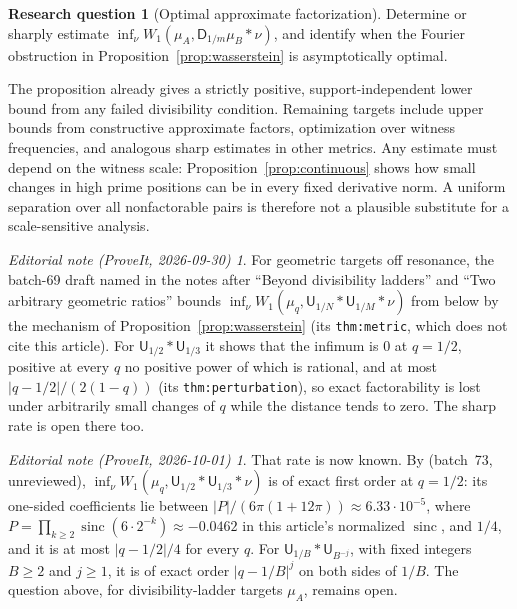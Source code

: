 \documentclass[11pt,a4paper]{article}
\theoremstyle{definition}
\newtheorem{question}{Research question}
\theoremstyle{remark}
\newtheorem*{ednotelater}{Editorial note (ProveIt, 2026-09-30)}
\newtheorem*{ednotethird}{Editorial note (ProveIt, 2026-10-01)}
\newcommand{\sinc}{\operatorname{sinc}}
\newcommand{\D}{\mathsf D}
\newcommand{\Unif}{\mathsf U}
\begin{document}
\begin{question}[Optimal approximate factorization]
Determine or sharply estimate
$\inf_\nu W_1(\mu_A,\D_{1/m}\mu_B*\nu)$, and identify when the Fourier
obstruction in Proposition~\ref{prop:wasserstein} is asymptotically optimal.
\end{question}
The proposition already gives a strictly positive, support-independent
lower bound from any failed divisibility condition. Remaining targets
include upper bounds from constructive approximate factors, optimization
over witness frequencies, and analogous sharp estimates in other metrics.
Any estimate must depend on the witness scale:
Proposition~\ref{prop:continuous} shows how small changes in high prime
positions can be in every fixed derivative norm. A uniform separation over
all nonfactorable pairs is therefore not a plausible substitute for a
scale-sensitive analysis.
\begin{ednotelater}
For geometric targets off resonance, the batch-69 draft named in the
notes after ``Beyond divisibility ladders'' and ``Two arbitrary geometric
ratios'' bounds $\inf_\nu W_1(\mu_q,\Unif_{1/N}*\Unif_{1/M}*\nu)$ from
below by the mechanism of Proposition~\ref{prop:wasserstein} (its
\texttt{thm:metric}, which does not cite this article). For
$\Unif_{1/2}*\Unif_{1/3}$ it shows that the infimum is $0$ at $q=1/2$,
positive at every $q$ no positive power of which is rational, and at most
$|q-1/2|/(2(1-q))$ (its \texttt{thm:perturbation}), so exact factorability
is lost under arbitrarily small changes of $q$ while the distance tends to
zero. The sharp rate is open there too.
\end{ednotelater}
\begin{ednotethird}
That rate is now known. By
(batch~73, unreviewed), $\inf_\nu W_1(\mu_q,\Unif_{1/2}*\Unif_{1/3}*\nu)$
is of exact first order at $q=1/2$: its one-sided coefficients lie
between $|P|/(6\pi(1+12\pi))\approx6.33\cdot10^{-5}$, where
$P=\prod_{k\ge2}\sinc(6\cdot2^{-k})\approx-0.0462$ in this article's
normalized $\sinc$, and $1/4$, and it is at most $|q-1/2|/4$ for every
$q$. For $\Unif_{1/B}*\Unif_{B^{-j}}$, with fixed integers $B\ge2$ and
$j\ge1$, it is of exact order $|q-1/B|^j$ on both sides of $1/B$. The
question above, for divisibility-ladder targets $\mu_A$, remains open.
\end{ednotethird}
\end{document}
